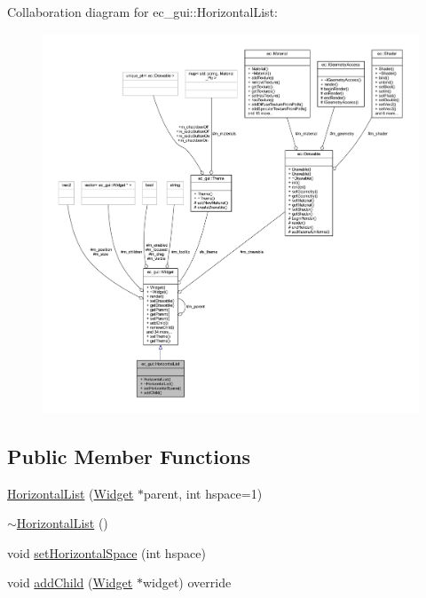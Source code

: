 Collaboration diagram for ec\+\_\+gui\+:\+:Horizontal\+List\+:\nopagebreak
\begin{figure}[H]
\begin{center}
\leavevmode
\includegraphics[width=350pt]{classec__gui_1_1_horizontal_list__coll__graph}
\end{center}
\end{figure}
\subsection*{Public Member Functions}
\begin{DoxyCompactItemize}
\item 
\mbox{\hyperlink{classec__gui_1_1_horizontal_list_adac2ef5c6045a59399caa45bc2b41c3e}{Horizontal\+List}} (\mbox{\hyperlink{classec__gui_1_1_widget}{Widget}} $\ast$parent, int hspace=1)
\item 
\mbox{\hyperlink{classec__gui_1_1_horizontal_list_aba34eabe0c77ab8fbc267ecd2a59a2f6}{$\sim$\+Horizontal\+List}} ()
\item 
void \mbox{\hyperlink{classec__gui_1_1_horizontal_list_a1b09fd8142623f4c5c4e845867862bd3}{set\+Horizontal\+Space}} (int hspace)
\item 
void \mbox{\hyperlink{classec__gui_1_1_horizontal_list_a1617ae9942c10e9b277e222ce4d3484f}{add\+Child}} (\mbox{\hyperlink{classec__gui_1_1_widget}{Widget}} $\ast$widget) override
\end{DoxyCompactItemize}
